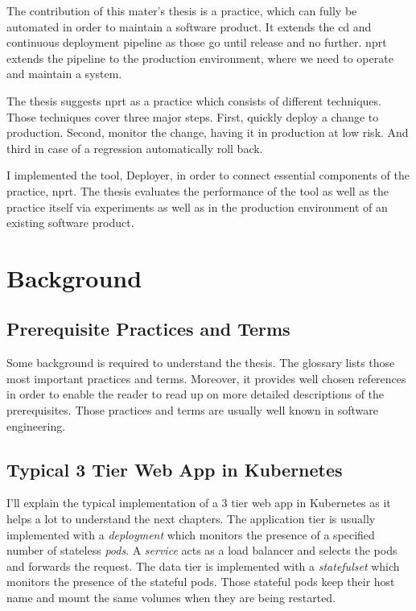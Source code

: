 The contribution of this mater's thesis is a practice, which can fully be automated in order
to maintain a software product. It extends the \gls{cd} and continuous deployment pipeline
as those go until release and no further. \gls{nprt} extends the pipeline to the
production environment, where we need to operate and maintain a system.

The thesis suggests \gls{nprt} as a practice which consists of different techniques. Those
techniques cover three major steps. First, quickly deploy a change to production. Second,
monitor the change, having it in production at low risk. And third in case of a regression
automatically roll back.

I implemented the tool, Deployer, in order to connect essential components of the
practice, \gls{nprt}. The thesis evaluates the performance of the tool as well as the
practice itself via experiments as well as in the production environment of an existing
software product.

\chapter{Background}
\label{chap:background}

\section{Prerequisite Practices and Terms}

Some background is required to understand the thesis. The glossary lists those most
important practices and terms. Moreover, it provides well chosen references in order to
enable the reader to read up on more detailed descriptions of the prerequisites. Those
practices and terms are usually well known in software engineering.

\section{Typical 3 Tier Web App in Kubernetes}

I'll explain the typical implementation of a 3 tier web app in Kubernetes as it helps a
lot to understand the next chapters. The application tier is usually implemented with a
\emph{deployment} which monitors the presence of a specified number of stateless
\emph{pods}. A \emph{service} acts as a load balancer and selects the pods and forwards
the request. The data tier is implemented with a \emph{statefulset} which monitors the
presence of the stateful pods. Those stateful pods keep their host name and mount the same
volumes when they are being restarted.

